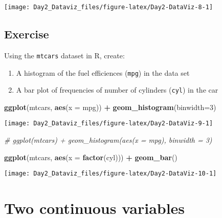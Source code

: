 \documentclass[12pt,letterpaperpaper,openany]{book}
\newenvironment{Shaded}{\begin{snugshade}}{\end{snugshade}}
\newcommand{\CommentTok}[1]{\textcolor[rgb]{0.56,0.35,0.01}{\textit{#1}}}
\newcommand{\DataTypeTok}[1]{\textcolor[rgb]{0.13,0.29,0.53}{#1}}
\newcommand{\DecValTok}[1]{\textcolor[rgb]{0.00,0.00,0.81}{#1}}
\newcommand{\KeywordTok}[1]{\textcolor[rgb]{0.13,0.29,0.53}{\textbf{#1}}}
\newcommand{\NormalTok}[1]{#1}
\newcommand{\OperatorTok}[1]{\textcolor[rgb]{0.81,0.36,0.00}{\textbf{#1}}}
\newcommand{\StringTok}[1]{\textcolor[rgb]{0.31,0.60,0.02}{#1}}
\providecommand{\tightlist}{%
  \setlength{\itemsep}{0pt}\setlength{\parskip}{0pt}}
\begin{document}
\texttt{[image: Day2\_Dataviz\_files/figure-latex/Day2-DataViz-8-1]}

\hypertarget{exercise}{%
\subsection{Exercise}\label{exercise}}

Using the \texttt{mtcars} dataset in R, create:

\begin{enumerate}
\def\labelenumi{\arabic{enumi}.}
\tightlist
\item
  A histogram of the fuel efficiences (\texttt{mpg}) in the data set
\item
  A bar plot of frequencies of number of cylinders (\texttt{cyl}) in the car
\end{enumerate}

\begin{Shaded}
\begin{Highlighting}[]
\KeywordTok{ggplot}\NormalTok{(mtcars, }\KeywordTok{aes}\NormalTok{(}\DataTypeTok{x =}\NormalTok{ mpg)) }\OperatorTok{+}\StringTok{ }\KeywordTok{geom_histogram}\NormalTok{(}\DataTypeTok{binwidth=}\DecValTok{3}\NormalTok{)}
\end{Highlighting}
\end{Shaded}

\texttt{[image: Day2\_Dataviz\_files/figure-latex/Day2-DataViz-9-1]}

\begin{Shaded}
\begin{Highlighting}[]
\CommentTok{# ggplot(mtcars) + geom_histogram(aes(x = mpg), binwidth = 3)}
\end{Highlighting}
\end{Shaded}

\begin{Shaded}
\begin{Highlighting}[]
\KeywordTok{ggplot}\NormalTok{(mtcars, }\KeywordTok{aes}\NormalTok{(}\DataTypeTok{x =} \KeywordTok{factor}\NormalTok{(cyl))) }\OperatorTok{+}\StringTok{ }\KeywordTok{geom_bar}\NormalTok{()}
\end{Highlighting}
\end{Shaded}

\texttt{[image: Day2\_Dataviz\_files/figure-latex/Day2-DataViz-10-1]}

\hypertarget{two-continuous-variables}{%
\section{Two continuous variables}\label{two-continuous-variables}}
\end{document}
